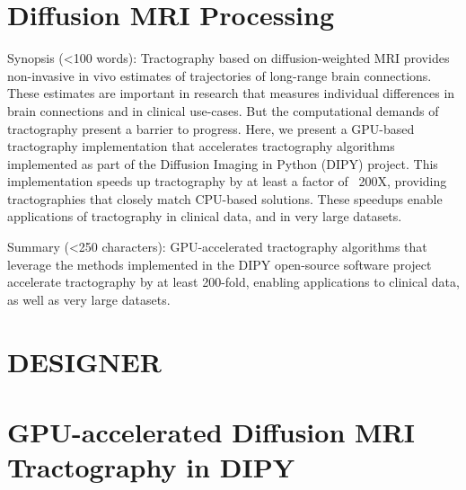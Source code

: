 \section{Diffusion MRI Processing}
Synopsis (<100 words): Tractography based on diffusion-weighted MRI provides non-invasive in vivo estimates of trajectories of long-range brain connections. These estimates are important in research that measures individual differences in brain connections and in clinical use-cases. But the computational demands of tractography present a barrier to progress. Here, we present a GPU-based tractography implementation that accelerates tractography algorithms implemented as part of the Diffusion Imaging in Python (DIPY) project. This implementation speeds up tractography by at least a factor of ~200X, providing tractographies that closely match CPU-based solutions. These speedups enable applications of tractography in clinical data, and in very large datasets.

Summary (<250 characters): GPU-accelerated tractography algorithms that leverage the methods implemented in the DIPY open-source software project accelerate tractography by at least 200-fold, enabling applications to clinical data, as well as very large datasets. 

\section{DESIGNER}

\section{GPU-accelerated Diffusion MRI Tractography in DIPY}

